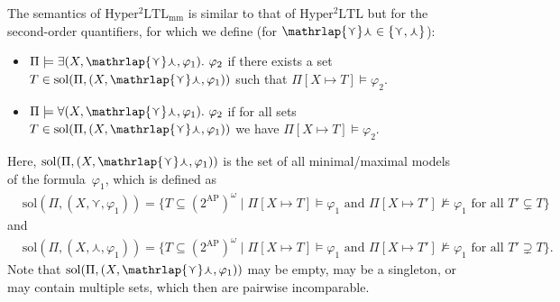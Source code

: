 \documentclass[dvipsnames,10pt,a4paper]{amsart}
\theoremstyle{definition}
\theoremstyle{remark}
\renewcommand{\phi}{\varphi}
\newcommand{\pow}[1]{2^{#1}}
\newcommand{\set}[1]{\{#1\}}
\newcommand{\sohyltl}{\mathrm{Hyper^2LTL}\xspace}
\newcommand{\sohyltlfp}{\mathrm{Hyper^2LTL_{\mathrm{mm}}}\xspace}
\newcommand{\ap}[0]{\mathrm{AP}}
\newcommand{\smallest}{\curlyvee}
\newcommand{\largest}{\curlywedge}
\newcommand{\smalar}{{\mathrlap{\curlyvee}\curlywedge}}
\newcommand{\solutions}{\mathrm{sol}}
\begin{document}
The semantics of $\sohyltlfp$ is similar to that of $\sohyltl$ but for the second-order quantifiers, for which we define (for $\smalar \in \set{\smallest,\largest}$):
\begin{itemize}
    \item $\Pi \models \exists (X,\smalar,\phi_1).\ \phi_2$ if there exists a set~$T \in \solutions(\Pi, (X,\smalar,\phi_1))$ such that $\Pi[X\mapsto T] \models \phi_2$.
    \item $\Pi \models \forall (X,\smalar,\phi_1).\ \phi_2$ if for all sets~$T \in \solutions(\Pi, (X,\smalar,\phi_1))$ we have $\Pi[X\mapsto T] \models \phi_2$.
\end{itemize}
Here, $\solutions(\Pi, (X,\smalar,\phi_1))$ is the set of all minimal/maximal models of the formula~$\phi_1$, which is defined as 
\begin{align*}
    {}&{}\!\!\!\solutions(\Pi, (X,\smallest,\phi_1))  = \set{T \subseteq (\pow{\ap})^\omega \mid \Pi[X\mapsto T] \models \phi_1\text{ and } 
    \Pi[X\mapsto T'] \not\models \phi_1 \text{ for all } T' \subsetneq T }
\end{align*}
and
\begin{align*}
    {}&{}\!\!\!\solutions(\Pi, (X,\largest,\phi_1))  = \set{T \subseteq (\pow{\ap})^\omega \mid \Pi[X\mapsto T] \models \phi_1 \text{ and }
     \Pi[X\mapsto T'] \not\models \phi_1 \text{ for all } T' \supsetneq T}.
\end{align*}
Note that $\solutions(\Pi, (X,\smalar,\phi_1))$ may be empty, may be a singleton, or may contain multiple sets, which then are pairwise incomparable.
\end{document}
